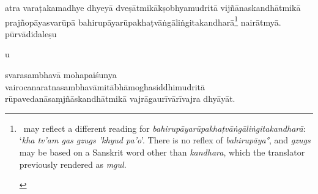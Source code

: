 \documentclass[naipra.tex]{subfiles}
\begin{document}
\begin{sanskrit}





\pstart
atra varaṭakamadhye dhyeyā  dveṣātmikākṣobhyamudritā vijñānaskandhātmikā prajñopāyasvarūpā bahirupāyarūpakhaṭvāṅgāliṅgitakandharā\footnote{\begin{english}
	\TIB\ may reflect a different reading for \emph{bahirupāyarūpakhaṭvāṅgāliṅgitakandharā}: `\emph{kha tv'am gas gzugs 'khyud pa'o}'.
	There is no reflex of \emph{bahirupāya°}, and \emph{gzugs} may be based on a Sanskrit word other than \emph{kandhara}, which the translator previously rendered as \emph{mgul}.
\end{english}} nairātmyā.
pūrvādidaleṣu \begin{mantra}\dsh u\end{mantra}\dsh svarasambhavā mohapaiśunya vairocanaratnasambhavāmitābhāmoghasiddhimudritā rūpavedanāsaṃjñāskandhātmikā vajrāgaurīvārīvajra dhyāyāt. 
\pend


\end{sanskrit}
\end{document}

